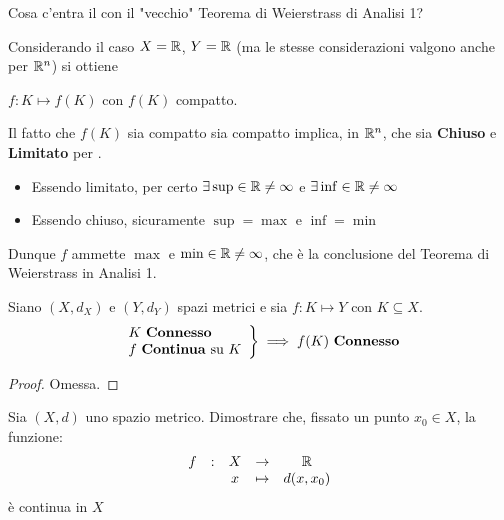 \begin{exercise}
	\label{teo:weier_analisi_1}
	Cosa c'entra il  con il "vecchio" Teorema di Weierstrass di Analisi 1?
	\begin{solution}
		Considerando il caso $X = \mathbb{R}$, $Y = \mathbb{R}$ (ma le stesse considerazioni valgono anche per $\mathbb{R}^n$) si ottiene
		\begin{center}
			$f:K \mapsto f(K)$ con $f(K)$ compatto.
		\end{center}
		Il fatto che $f(K)$ sia compatto sia compatto implica, in $\mathbb{R}^n$, che sia \textbf{Chiuso} e \textbf{Limitato} per .
		\begin{itemize}
			\item Essendo limitato, per certo $\exists \sup \in \mathbb{R} \neq \infty$ e $\exists \inf \in \mathbb{R} \neq \infty$
			\item Essendo chiuso, sicuramente $\sup = \max$ e $\inf = \min$
		\end{itemize}
		Dunque $f$ ammette $\max$ e $\min \in \mathbb{R} \neq \infty$, che è la conclusione del Teorema di Weierstrass in Analisi 1.
	\end{solution}
\end{exercise}
\begin{proposition}
	Siano $(X,d_X)$ e $(Y,d_Y)$ spazi metrici e sia $f:K \mapsto Y$ con $K \subseteq X$.
	\begin{equation*}
		\left.
		\begin{array}{l}
		K \text{ \textbf{Connesso}} \\
		f \text{ \textbf{Continua} su } K
		\end{array}
		\right\} \implies
		f(K) \text{ \textbf{Connesso}}
	\end{equation*}
	\begin{proof}
		Omessa.
	\end{proof}
\end{proposition}
\begin{exercise}
	Sia $(X,d)$ uno spazio metrico. Dimostrare che, fissato un punto $x_0 \in X$, la funzione:
	$$\begin{array}{ccccc} {f} & : & {X} & \to & {\mathbb{R}} \\ & & {x} & \mapsto & {d(x,x_0)} \\ \end{array}$$
	è continua in $X$
\end{exercise}

